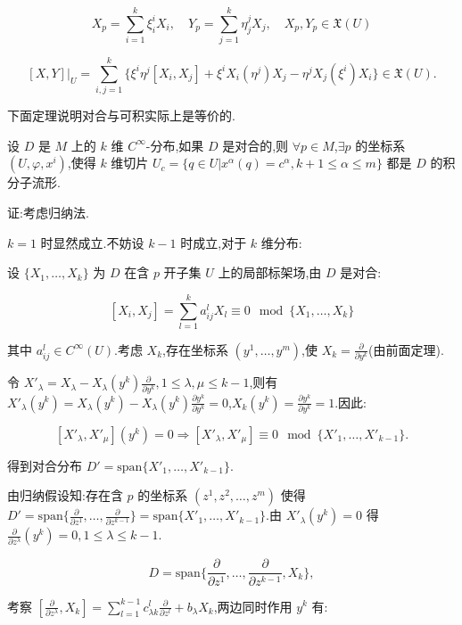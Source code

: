 \[
X_p = \sum_{i=1}^k \xi_i^i X_i, \quad Y_p = \sum_{j=1}^k \eta_j^j X_j, \quad X_p, Y_p \in \mathfrak{X}(U)
\]

\[
[X,Y]|_U = \sum_{i,j=1}^k \{ \xi^i \eta^j [X_i, X_j] + \xi^i X_i (\eta^j) X_j - \eta^j X_j (\xi^i) X_i \} \in \mathfrak{X}(U).
\]

下面定理说明对合与可积实际上是等价的.

\begin{theorem}[Frobenius]
设 $D$ 是 $M$ 上的 $k$ 维 $C^\infty$-分布,如果 $D$ 是对合的,则 $\forall p \in M$,$\exists p$ 的坐标系 $(U, \varphi, x^i)$,使得 $k$ 维切片 $U_c = \{ q \in U | x^\alpha (q) = c^\alpha, k+1 \leq \alpha \leq m \}$ 都是 $D$ 的积分子流形.
\end{theorem}

证:考虑归纳法.

$k=1$ 时显然成立.不妨设 $k-1$ 时成立,对于 $k$ 维分布:

设 $\{ X_1, \ldots, X_k \}$ 为 $D$ 在含 $p$ 开子集 $U$ 上的局部标架场,由 $D$ 是对合:

\[
[X_i, X_j] = \sum_{l=1}^k a_{ij}^l X_l \equiv 0 \mod \{ X_1, \ldots, X_k \}
\]

其中 $a_{ij}^l \in C^\infty(U)$.考虑 $X_k$,存在坐标系 $(y^1, \ldots, y^m)$,使 $X_k = \frac{\partial}{\partial y^k}$(由前面定理).

令 $X'_\lambda = X_\lambda - X_\lambda (y^k) \frac{\partial}{\partial y^k}, 1 \leq \lambda, \mu \leq k-1$,则有 $X'_\lambda (y^k) = X_\lambda (y^k) - X_\lambda (y^k) \frac{\partial y^k}{\partial y^k} = 0$,$X_k (y^k) = \frac{\partial y^k}{\partial y^k} = 1$.因此:

\[
[X'_\lambda, X'_\mu](y^k) = 0 \Rightarrow [X'_\lambda, X'_\mu] \equiv 0 \mod \{ X'_1, \ldots, X'_{k-1} \}.
\]

得到对合分布 $D' = \text{span} \{ X'_1, \ldots, X'_{k-1} \}$.

由归纳假设知:存在含 $p$ 的坐标系 $(z^1, z^2, \ldots, z^m)$ 使得 $D' = \text{span} \{ \frac{\partial}{\partial z^1}, \ldots, \frac{\partial}{\partial z^{k-1}} \} = \text{span} \{ X'_1, \ldots, X'_{k-1} \}$.由 $X'_\lambda (y^k) = 0$ 得 $\frac{\partial}{\partial z^\lambda} (y^k) = 0, 1 \leq \lambda \leq k-1$.

\[
D = \text{span} \{ \frac{\partial}{\partial z^1}, \ldots, \frac{\partial}{\partial z^{k-1}}, X_k \},
\]

考察 $[\frac{\partial}{\partial z^\lambda}, X_k] = \sum_{l=1}^{k-1} c_{\lambda k}^l \frac{\partial}{\partial z^l} + b_\lambda X_k$,两边同时作用 $y^k$ 有:

